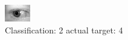 \begin{figure}[h!]
\begin{center}
\includegraphics[width=0.60\columnwidth]{figures/ID808_class_2_target_4.png}
\end{center}
\caption{ Classification: 2 actual target: 4}
\label{fig:ID808_class_2_target_4}
\end{figure}
